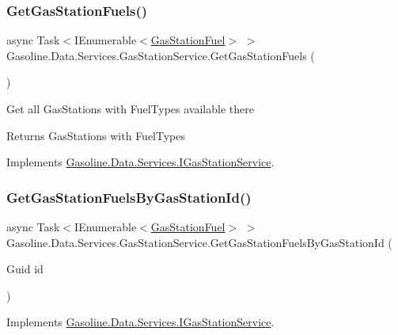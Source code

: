 \subsubsection{\texorpdfstring{GetGasStationFuels()}{GetGasStationFuels()}}
{\footnotesize\ttfamily async Task$<$I\+Enumerable$<$\mbox{\hyperlink{class_gasoline_1_1_data_1_1_models_1_1_gas_station_fuel}{Gas\+Station\+Fuel}}$>$ $>$ Gasoline.\+Data.\+Services.\+Gas\+Station\+Service.\+Get\+Gas\+Station\+Fuels (\begin{DoxyParamCaption}{ }\end{DoxyParamCaption})}



Get all Gas\+Stations with Fuel\+Types available there 

\begin{DoxyReturn}{Returns}
Gas\+Stations with Fuel\+Types
\end{DoxyReturn}


Implements \mbox{\hyperlink{interface_gasoline_1_1_data_1_1_services_1_1_i_gas_station_service_a6ce56950a33e26aa14da2e8b1b92948b}{Gasoline.\+Data.\+Services.\+I\+Gas\+Station\+Service}}.

\mbox{\label{class_gasoline_1_1_data_1_1_services_1_1_gas_station_service_a74d212652b5b4d79bae715b9e2ac8034}} 
\subsubsection{\texorpdfstring{GetGasStationFuelsByGasStationId()}{GetGasStationFuelsByGasStationId()}}
{\footnotesize\ttfamily async Task$<$I\+Enumerable$<$\mbox{\hyperlink{class_gasoline_1_1_data_1_1_models_1_1_gas_station_fuel}{Gas\+Station\+Fuel}}$>$ $>$ Gasoline.\+Data.\+Services.\+Gas\+Station\+Service.\+Get\+Gas\+Station\+Fuels\+By\+Gas\+Station\+Id (\begin{DoxyParamCaption}\item[{Guid}]{id }\end{DoxyParamCaption})}



Implements \mbox{\hyperlink{interface_gasoline_1_1_data_1_1_services_1_1_i_gas_station_service_a6e69c73a645741984d2dc56cdd1a835c}{Gasoline.\+Data.\+Services.\+I\+Gas\+Station\+Service}}.

